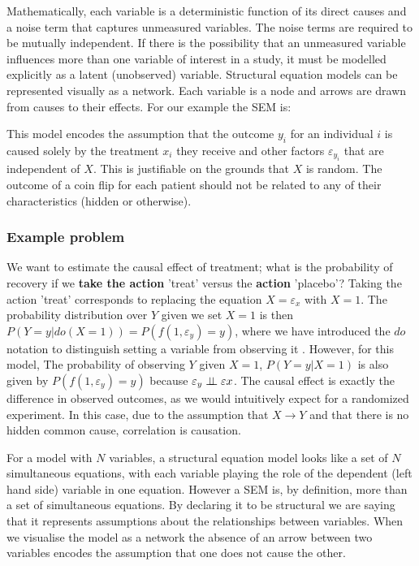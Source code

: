 \documentclass[11pt,a4paper,oneside]{book}
\let\epsilon\varepsilon
\begin{document}
Mathematically, each variable is a deterministic function of its direct causes and a noise term that captures unmeasured variables. The noise terms are required to be mutually independent. If there is the possibility that an unmeasured variable influences more than one variable of interest in a study, it must be modelled explicitly as a latent (unobserved) variable. Structural equation models can be represented visually as a network. Each variable is a node and arrows are drawn from causes to their effects. For our example the SEM is:

This model encodes the assumption that the outcome $y_{i}$ for an individual $i$ is caused solely by the treatment $x_{i}$ they receive and other factors $\epsilon_{y_{i}}$ that are independent of $X$. This is justifiable on the grounds that $X$ is random. The outcome of a coin flip for each patient should not be related to any of their characteristics (hidden or otherwise). 
 
\subsubsection*{Example problem}
We want to estimate the causal effect of treatment; what is the probability of recovery if we \textbf{take the action} 'treat' versus the \textbf{action} 'placebo'? Taking the action 'treat'  corresponds to replacing the equation $X = \epsilon_{x}$ with $X=1$. The probability distribution over $Y$ given we set $X=1$ is then $P(Y = y|do(X=1)) = P(f(1,\epsilon_{y})=y)$, where we have introduced the $do$ notation to distinguish setting a variable from observing it \cite{Pearl1995}. However, for this model,  The probability of observing $Y$ given $X=1$, $P(Y = y|X = 1)$ is also given by $P(f(1,\epsilon_{y})=y)$ because $\epsilon_{y} \ci \epsilon{x}$. The causal effect is exactly the difference in observed outcomes, as we would intuitively expect for a randomized experiment. In this case, due to the assumption that $X \rightarrow Y$ and that there is no hidden common cause, correlation is causation.  

For a model with $N$ variables, a structural equation model looks like a set of $N$ simultaneous equations, with each variable playing the role of the dependent (left hand side) variable in one equation. However a SEM is, by definition, more than a set of simultaneous equations. By declaring it to be structural we are saying that it represents assumptions about the relationships between variables. When we visualise the model as a network the absence of an arrow between two variables encodes the assumption that one does not cause the other.
\end{document}
